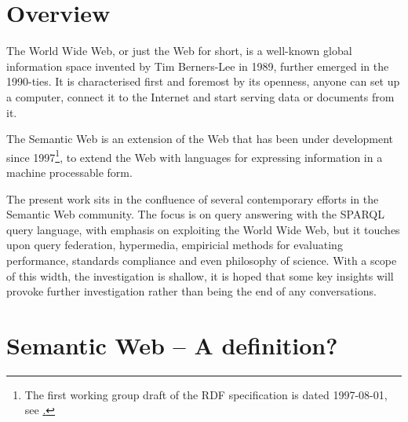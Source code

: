 \section{Overview}

The World Wide Web, or just the Web for short, is a well-known global
information space invented by Tim Berners-Lee in 1989, further emerged
in the 1990-ties. It is characterised first and foremost by its
openness, anyone can set up a computer, connect it to the Internet and
start serving data or documents from it. 

The Semantic Web is an extension of the Web that has been under
development since 1997\footnote{The first working group draft of the
  RDF specification is dated 1997-08-01, see
  \href{http://www.w3.org/TR/WD-rdf-syntax-971002/}.}, to extend the
Web with languages for expressing information in a machine processable
form\cite{TODO}.



The present work sits in the confluence of several contemporary
efforts in the Semantic Web community. The focus is on query answering
with the SPARQL query language, with emphasis on exploiting the World
Wide Web, but it touches upon query federation, hypermedia, empiricial
methods for evaluating performance, standards compliance and even
philosophy of science. With a scope of this width, the investigation
is shallow, it is hoped that some key insights will provoke further
investigation rather than being the end of any conversations.

\section{Semantic Web -- A definition?}

